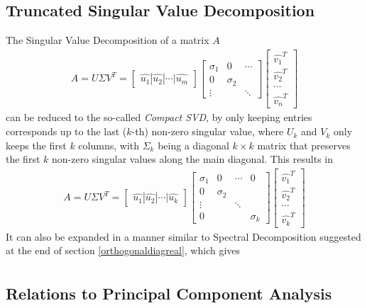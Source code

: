 \subsection{Truncated Singular Value Decomposition}
The Singular Value Decomposition of a matrix $A$
\begin{align*}
A = U\Sigma V^T = \begin{bmatrix}
\hat{u_1}|\hat{u_2}|\cdots|\hat{u_m}
\end{bmatrix}
\begin{bmatrix}
\sigma_1 & 0 & \cdots \\
0 & \sigma_2 & \\
\vdots & & \ddots
\end{bmatrix}
\left[
\begin{array}{c}
\hat{v_1}^T \\
\hline
\hat{v_2}^T \\
\hline
\cdots \\
\hline
\hat{v_n}^T
\end{array}
\right]
\end{align*}
can be reduced to the so-called \textit{Compact SVD}, by only keeping entries corresponds up to the last ($k$-th) non-zero singular value, where $U_k$ and $V_k$ only keeps the first $k$ columns, with $\Sigma_k$ being a diagonal $k \times k$ matrix that preserves the first $k$ non-zero singular values along the main diagonal. This results in
\begin{align*}
A = U\Sigma V^T = \begin{bmatrix}
\hat{u_1}|\hat{u_2}|\cdots|\hat{u_k}
\end{bmatrix}
\begin{bmatrix}
\sigma_1 & 0 & \cdots & 0 \\
0 & \sigma_2 & & \\
\vdots & & \ddots & \\
0 & & & \sigma_k
\end{bmatrix}
\left[
\begin{array}{c}
\hat{v_1}^T \\
\hline
\hat{v_2}^T \\
\hline
\cdots \\
\hline
\hat{v_k}^T
\end{array}
\right]
\end{align*}
It can also be expanded in a manner similar to Spectral Decomposition suggested at the end of section \ref{orthogonaldiagreal}, which gives
\begin{align*}

\end{align*}


\subsection{Relations to Principal Component Analysis}